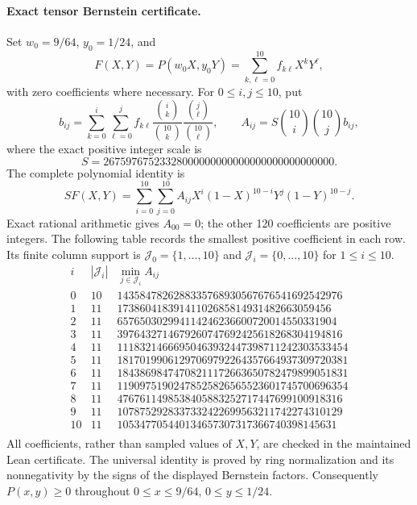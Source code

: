 \paragraph{Exact tensor Bernstein certificate.}
Set \(w_0=9/64\), \(y_0=1/24\), and
\[
 F(X,Y)=P(w_0X,y_0Y)=\sum_{k,\ell=0}^{10}f_{k\ell}X^kY^\ell,
\]
with zero coefficients where necessary.  For \(0\le i,j\le10\), put
\[
 b_{ij}=\sum_{k=0}^i\sum_{\ell=0}^j
 f_{k\ell}\frac{\binom{i}{k}}{\binom{10}{k}}
             \frac{\binom{j}{\ell}}{\binom{10}{\ell}},\qquad
 A_{ij}=S\binom{10}{i}\binom{10}{j}b_{ij},
\]
where the exact positive integer scale is
\[
 S=26759767523328000000000000000000000000000.
\]
The complete polynomial identity is
\begin{equation}
 S F(X,Y)=\sum_{i=0}^{10}\sum_{j=0}^{10}
 A_{ij}X^i(1-X)^{10-i}Y^j(1-Y)^{10-j}.
 \label{eq:cluster-bernstein}
\end{equation}
Exact rational arithmetic gives \(A_{00}=0\); the other 120 coefficients
are positive integers.  The following table records the smallest positive
coefficient in each row.  Its finite column support is
\(\mathcal J_0=\{1,\ldots,10\}\) and
\(\mathcal J_i=\{0,\ldots,10\}\) for \(1\le i\le10\).
\[
 \begin{array}{r|r|r}
 i & |\mathcal J_i| & \min_{j\in\mathcal J_i} A_{ij}\\\hline
0 & 10 & 1435847826288335768930567676541692542976 \\
1 & 11 & 17386041839141102685814931482663059456 \\
2 & 11 & 657650302994114246236600720014550331904 \\
3 & 11 & 3976432714679260747692425618268304194816 \\
4 & 11 & 11183214666950463932447398711242303533454 \\
5 & 11 & 18170199061297069792264357664937309720381 \\
6 & 11 & 18438698474708211172663650782479899051831 \\
7 & 11 & 11909751902478525826565523601745700696354 \\
8 & 11 & 4767611498538405883252717447699100918316 \\
9 & 11 & 1078752928337332422699563211742274310129 \\
10 & 11 & 105347705440134657307317366740398145631 \\
 \end{array}
\]
All coefficients, rather than sampled values of \(X,Y\), are checked in
the maintained Lean certificate.  The universal identity is proved by
ring normalization and its nonnegativity by the signs of the displayed
Bernstein factors.  Consequently \(P(x,y)\ge0\) throughout
\(0\le x\le9/64\), \(0\le y\le1/24\).

